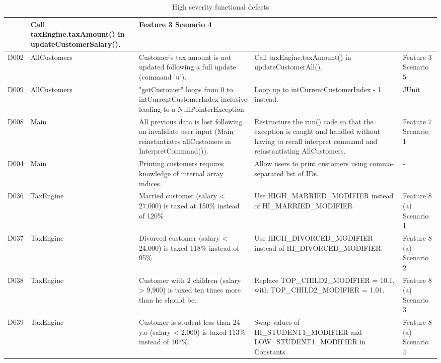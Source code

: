 \begin{table}[H]
\begin{tabularx}{\textwidth}{| c | P | X | X | P |}
& Call taxEngine.taxAmount() in updateCustomerSalary(). 
& Feature 3 Scenario 4 \\
\hline %
D002 
& AllCustomers 
& Customer's tax amount is not updated following a full update (command 'u').
& Call taxEngine.taxAmount() in updateCustomerAll(). 
& Feature 3 Scenario 5\\
\hline %
D009 
& AllCustomers 
& "getCustomer" loops from 0 to intCurrentCustomerIndex inclusive leading to a NullPointerException
& Loop up to intCurrentCustomerIndex - 1 instead.
& JUnit  \\
\hline %
D008 
& Main
& All previous data is lost following an invalidate user input (Main reinstantiates allCustomers in InterpretCommand()).
& Restructure the run() code so that the exception is caught and handled without having to recall interpret command and reinstantiating AllCustomers. 
& Feature 7 Scenario 1 \\
\hline %
D004 
& Main 
& Printing customers requires knowledge of internal array indices.  
& Allow users to print customers using comma-separated list of IDs.
& -\\
\hline %
D036 
& TaxEngine
& Married customer (salary < 27,000) is taxed at 150\% instead of 120\%
& Use HIGH\_MARRIED\_MODIFIER instead of HI\_MARRIED\_MODIFIER
& Feature 8 (a) Scenario 1\\
\hline %
D037
& TaxEngine
& Divorced customer (salary < 24,000) is taxed 118\% instead of 95\%
& Use HIGH\_DIVORCED\_MODIFIER instead of HI\_DIVORCED\_MODIFIER.
& Feature 8 (a) Scenario 2\\
\hline %
D038
& TaxEngine
& Customer with 2 children (salary > 9,900) is taxed ten times more than he should be. 
& Replace TOP\_CHILD2\_MODIFIER = 10.1, with TOP\_CHILD2\_MODIFIER = 1.01.
& Feature 8 (a) Scenario 3\\
\hline %
D039
& TaxEngine
& Customer is student less than 24 y.o (salary < 2,000) is taxed 113\% instead of 107\%. 
& Swap values of HI\_STUDENT1\_MODIFIER and LOW\_STUDENT1\_MODIFIER in Constants.
& Feature 8 (a) Scenario 4\\
\hline %
\end{tabularx}
\caption{High severity functional defects}
\end{table}

